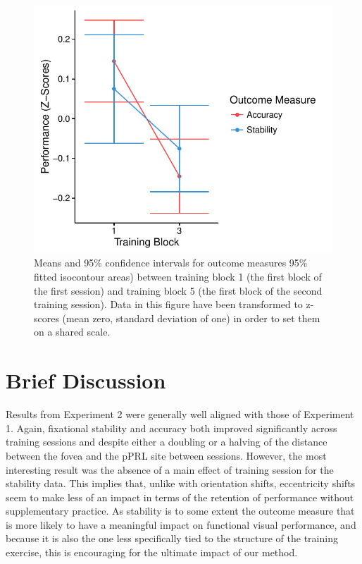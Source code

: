 \begin{figure}[htbp]
\centering
\includegraphics[width=.75\linewidth,height=.75\textheight,keepaspectratio]{figures/chapter_2/paired_t_results.pdf}
\caption[Experiment 2: Performance Comparison Between First Block of Both Sessions for Both Outcome Measures]{Means and 95\% confidence intervals for outcome measures 95\% fitted isocontour areas) between training block 1 (the first block of the first session) and training block 5 (the first block of the second training session). Data in this figure have been transformed to z-scores (mean zero, standard deviation of one) in order to set them on a shared scale.}\label{chap_2_paired_t}
\end{figure}

\section{Brief Discussion}

Results from Experiment 2 were generally well aligned with those of Experiment 1. Again, fixational stability and accuracy both improved significantly across training sessions and despite either a doubling or a halving of the distance between the fovea and the pPRL site between sessions. However, the most interesting result was the absence of a main effect of training session for the stability data. This implies that, unlike with orientation shifts, eccentricity shifts seem to make less of an impact in terms of the retention of performance without supplementary practice. As stability is to some extent the outcome measure that is more likely to have a meaningful impact on functional visual performance, and because it is also the one less specifically tied to the structure of the training exercise, this is encouraging for the ultimate impact of our method.
